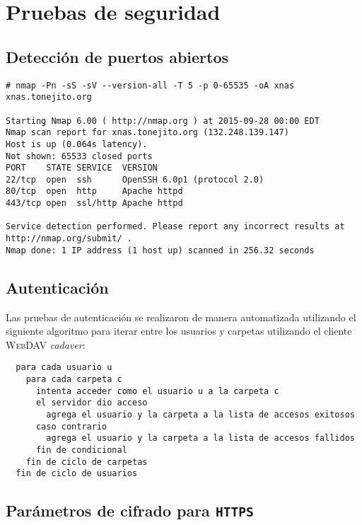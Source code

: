     \section {Pruebas de seguridad}

      \subsection {Detecci\'{o}n de puertos abiertos}

{
\scriptsize
\linespread{1}
\begin{verbatim}
# nmap -Pn -sS -sV --version-all -T 5 -p 0-65535 -oA xnas xnas.tonejito.org

Starting Nmap 6.00 ( http://nmap.org ) at 2015-09-28 00:00 EDT
Nmap scan report for xnas.tonejito.org (132.248.139.147)
Host is up (0.064s latency).
Not shown: 65533 closed ports
PORT    STATE SERVICE  VERSION
22/tcp  open  ssh      OpenSSH 6.0p1 (protocol 2.0)
80/tcp  open  http     Apache httpd
443/tcp open  ssl/http Apache httpd

Service detection performed. Please report any incorrect results at http://nmap.org/submit/ .
Nmap done: 1 IP address (1 host up) scanned in 256.32 seconds
\end{verbatim}
}


      \subsection {Autenticaci\'{o}n}

Las pruebas de autenticaci\'{o}n se realizaron de manera automatizada utilizando el siguiente algoritmo para iterar entre los usuarios y carpetas utilizando el cliente \textsc{WebDAV} \textsl{cadaver}:

{
\scriptsize
\linespread{1}
\begin{verbatim}
  para cada usuario u
    para cada carpeta c
      intenta acceder como el usuario u a la carpeta c
      el servidor dio acceso
        agrega el usuario y la carpeta a la lista de accesos exitosos
      caso contrario
        agrega el usuario y la carpeta a la lista de accesos fallidos
      fin de condicional
    fin de ciclo de carpetas
  fin de ciclo de usuarios
\end{verbatim}
}

      \subsection {Par\'{a}metros de cifrado para \texttt{HTTPS}}


